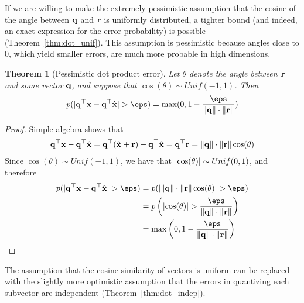 \documentclass[]{article}
\newtheorem{theorem}{Theorem}[section]
\begin{document}

If we are willing to make the extremely pessimistic assumption that the cosine of the angle between $\mathbf{q}$ and $\mathbf{r}$ is uniformly distributed, a tighter bound (and indeed, an exact expression for the error probability) is possible (Theorem~\ref{thm:dot_unif}). This assumption is pessimistic because angles close to $0$, which yield smaller errors, are much more probable in high dimensions. %

\begin{theorem}[Pessimistic dot product error]
Let $\theta$ denote the angle between $\mathbf{r}$ and some vector $\mathbf{q}$, and suppose that $\cos(\theta) \sim Unif(-1, 1)$. Then
\begin{align}
    p(\abs{\q^\top \x - \q^\top \xhat} > \eps) = \max(0, 1 - \frac{\eps}{\norm{\q} \cdot \norm{\r}})
\end{align}
\end{theorem}

\begin{proof}
Simple algebra shows that
\begin{align} \label{eq:qTr}
    \mathbf{q}^\top \mathbf{x} - \mathbf{q}^\top \hat{\mathbf{x}} = \mathbf{q}^\top(\hat{\mathbf{x}} + \mathbf{r}) - \mathbf{q}^\top \hat{\mathbf{x}} = \mathbf{q}^\top \mathbf{r} = \lVert\mathbf{q}\rVert \cdot \lVert\mathbf{r}\rVert \cos(\theta)
\end{align}
Since $\cos(\theta) \sim Unif(-1, 1)$, we have that $\lvert\cos(\theta)\rvert \sim Unif(0, 1)$, and therefore
\begin{align}
    p(\abs{\q^\top \x - \q^\top \xhat} > \eps) &= p(\abs{\norm{\q} \cdot \norm{\r} \cos(\theta)} > \eps ) \\
    &= p \left( \abs{\cos(\theta)} > \frac{\eps}{\norm{\q} \cdot \norm{\r} } \right) \\
    &= \max \left( 0, 1 - \frac{\eps}{\norm{\q} \cdot \norm{\r}} \right)
\end{align}
\end{proof}


The assumption that the cosine similarity of vectors is uniform can be replaced with the slightly more optimistic assumption that the errors in quantizing each subvector are independent (Theorem~\ref{thm:dot_indep}).
\end{document}
